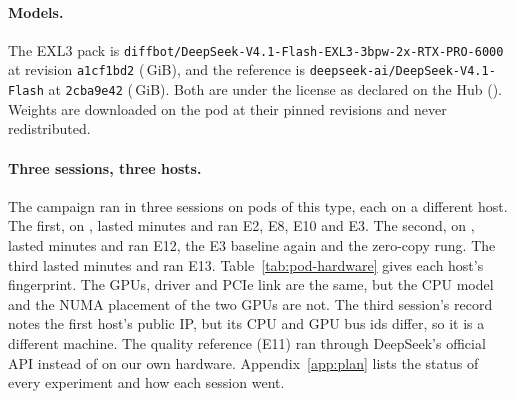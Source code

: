 \paragraph{Models.}
The EXL3 pack is \texttt{diffbot/DeepSeek-V4.1-Flash-EXL3-3bpw-2x-RTX-PRO-6000} at revision \texttt{a1cf1bd2}
(\,GiB), and the reference is \texttt{deepseek-ai/DeepSeek-V4.1-Flash} at \texttt{2cba9e42}
(\,GiB). Both are under the  license as declared on the Hub
(). Weights are downloaded on the pod at their pinned revisions and never redistributed.

\paragraph{Three sessions, three hosts.}
The campaign ran in three sessions on pods of this type, each on a different host. The first, on
, lasted  minutes and ran E2, E8, E10 and E3. The second, on
, lasted  minutes and ran E12, the E3 baseline again and the zero-copy
rung. The third lasted  minutes and ran E13. Table~\ref{tab:pod-hardware} gives each host's
fingerprint. The GPUs, driver and PCIe link are the same, but the CPU model and the NUMA placement of the two GPUs are
not. The third session's record notes the first host's public IP, but its CPU and GPU bus ids differ, so it is a
different machine. The quality reference (E11) ran through DeepSeek's official API instead of on our own hardware.
Appendix~\ref{app:plan} lists the status of every experiment and how each session went.



